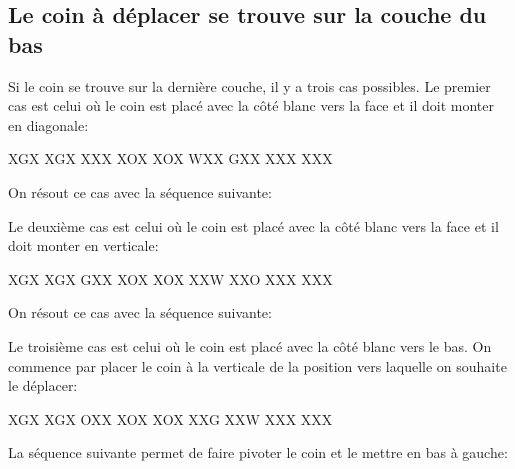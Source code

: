 \documentclass[10pt,paper=a5,pagesize]{scrbook}
\begin{document}
\subsection{Le coin à déplacer se trouve sur la couche du bas}

Si le coin se trouve sur la dernière couche, il y a trois cas possibles.
Le premier cas est celui où le coin est placé avec la côté blanc vers
la face et il doit monter en diagonale: 

\begin{center}  	
  	\RubikFaceRight%
  	{X}{G}{X}%
  	{X}{G}{X}%
  	{X}{X}{X}
  	\RubikFaceFront%
  	{X}{O}{X}%
  	{X}{O}{X}%
  	{W}{X}{X}
  	\RubikFaceDown%
  	{G}{X}{X}%
  	{X}{X}{X}%
  	{X}{X}{X}
  	
\end{center} 

On résout ce cas avec la séquence suivante:

Le deuxième cas est celui où le coin est placé avec la côté blanc vers
la face et il doit monter en verticale: 

\begin{center}
	\RubikFaceRight%
	{X}{G}{X}%
	{X}{G}{X}%
	{G}{X}{X}
	\RubikFaceFront%
	{X}{O}{X}%
	{X}{O}{X}%
	{X}{X}{W}
	\RubikFaceDown%
	{X}{X}{O}%
	{X}{X}{X}%
	{X}{X}{X}
	
\end{center} 

On résout ce cas avec la séquence suivante:


Le troisième cas est celui où le coin est placé avec la côté blanc vers
le bas. On commence par placer le coin à la verticale de la position
vers laquelle on souhaite le déplacer:

\begin{center}
	\RubikFaceRight%
	{X}{G}{X}%
	{X}{G}{X}%
	{O}{X}{X}
	\RubikFaceFront%
	{X}{O}{X}%
	{X}{O}{X}%
	{X}{X}{G}
	\RubikFaceDown%
	{X}{X}{W}%
	{X}{X}{X}%
	{X}{X}{X}
	
\end{center} 

La séquence suivante permet de faire pivoter le coin et le mettre en bas à gauche: 
\end{document}
